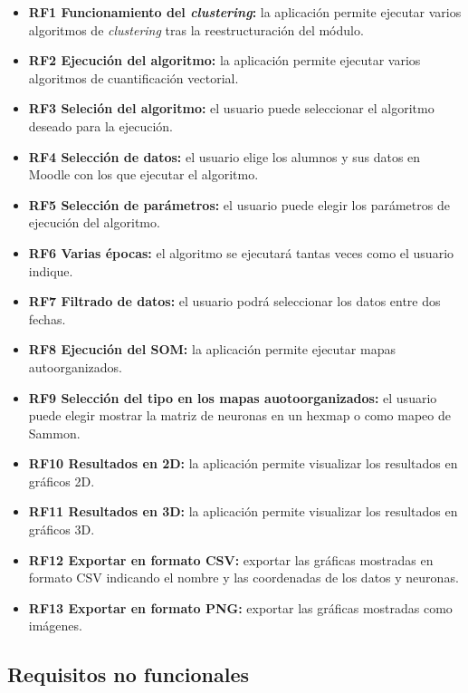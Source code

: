 \begin{itemize}

    \item \textbf{RF1 Funcionamiento del \emph{clustering}:} la aplicación permite ejecutar varios algoritmos de \emph{clustering} tras la reestructuración del módulo.
    \item \textbf{RF2 Ejecución del algoritmo:} la aplicación permite ejecutar varios algoritmos de cuantificación vectorial.
    \item \textbf{RF3 Seleción del algoritmo:} el usuario puede seleccionar el algoritmo deseado para la ejecución.
	\item \textbf{RF4 Selección de datos:} el usuario elige los alumnos y sus datos en Moodle con los que ejecutar el algoritmo.
	\item \textbf{RF5 Selección de parámetros:} el usuario puede elegir los parámetros de ejecución del algoritmo.
	\item \textbf{RF6 Varias épocas:} el algoritmo se ejecutará tantas veces como el usuario indique.
	\item \textbf{RF7 Filtrado de datos:} el usuario podrá seleccionar los datos entre dos fechas.
    \item \textbf{RF8 Ejecución del SOM:} la aplicación permite ejecutar mapas autoorganizados.
	\item \textbf{RF9 Selección del tipo en los mapas auotoorganizados:} el usuario puede elegir mostrar la matriz de neuronas en un hexmap o como mapeo de Sammon.
    \item \textbf{RF10 Resultados en 2D:} la aplicación permite visualizar los resultados en gráficos 2D.
    \item \textbf{RF11 Resultados en 3D:} la aplicación permite visualizar los resultados en gráficos 3D.
	\item \textbf{RF12 Exportar en formato CSV:} exportar las gráficas mostradas en formato CSV indicando el nombre y las coordenadas de los datos y neuronas.
	\item \textbf{RF13 Exportar en formato PNG:} exportar las gráficas mostradas como imágenes.

\end{itemize}

\subsection{Requisitos no funcionales}


